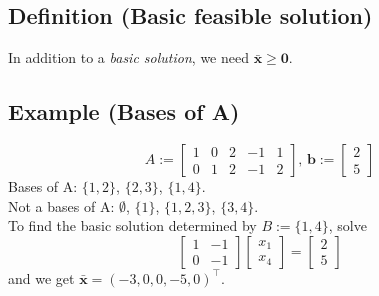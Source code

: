\subsection{Definition (Basic feasible solution)}
In addition to a \emph{basic solution}, we need  $\mathbf{\bar{x}}\ge \mathbf{0}$.

\subsection{Example (Bases of A)}
\[A:=
\begin{bmatrix}
    1 & 0 & 2 & -1 & 1\\
    0 & 1 & 2 & -1 & 2
\end{bmatrix}
\text{, }
\mathbf{b}:=
\begin{bmatrix}
    2\\
    5
\end{bmatrix}
\]
Bases of A: $\{1,2\}$, $\{2,3\}$, $\{1,4\}$.\\
Not a bases of A: $\emptyset$, $\{1\}$, $\{1,2,3\}$, $\{3,4\}$.\\
To find the basic solution determined by $B:=\{1,4\}$, solve
\[
\begin{bmatrix}
    1 & -1\\
    0 & -1
\end{bmatrix}
\begin{bmatrix}
    x_1\\
    x_4
\end{bmatrix}
=
\begin{bmatrix}
    2\\
    5
\end{bmatrix}
\]
and we get $\mathbf{\bar{x}}=(-3,0,0,-5,0)^\top $.